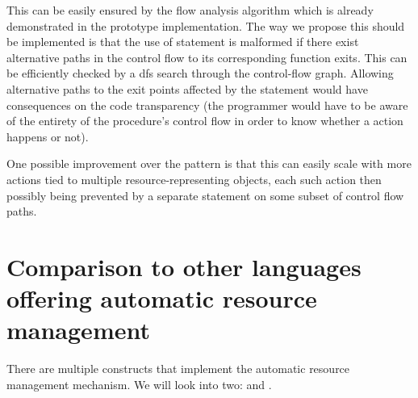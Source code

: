 This can be easily ensured by the flow analysis algorithm which is already demonstrated in the prototype implementation. The way we propose this should be implemented is that the use of  statement is malformed if there exist alternative paths in the control flow to its corresponding function exits. This can be efficiently checked by a dfs search through the control-flow graph. Allowing alternative paths to the exit points affected by the  statement would have consequences on the code transparency (the programmer would have to be aware of the entirety of the procedure's control flow in order to know whether a  action happens or not).

One possible improvement over the  pattern is that this can easily scale with more actions tied to multiple resource-representing objects, each such action then possibly being prevented by a separate  statement on some subset of control flow paths.

\section{Comparison to other languages offering automatic resource management}

There are multiple constructs that implement the automatic resource management mechanism. We will look into two:  and .
